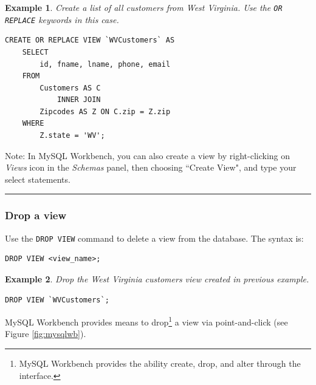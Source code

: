 \documentclass{article}
\newtheorem{example}{Example}
\begin{document}
  
 \begin{example}
 Create a list of all customers from West Virginia.  Use the \texttt{OR REPLACE} keywords in this case.
 \end{example}


\begin{lstlisting}[frame=single]  
CREATE OR REPLACE VIEW `WVCustomers` AS
	SELECT 
		id, fname, lname, phone, email
	FROM
		Customers AS C
			INNER JOIN
		Zipcodes AS Z ON C.zip = Z.zip
	WHERE
		Z.state = 'WV';
\end{lstlisting} 


\noindent Note: In MySQL Workbench, you can also create a view by right-clicking on \textit{Views} icon in the \textit{Schemas} panel, then choosing ``Create View", and type your select statements.   











\hspace{-0.5cm}\rule[-0.101in]{\textwidth}{0.0025in}
    
  


\subsubsection*{Drop a view}

Use the \texttt{DROP VIEW} command to delete a view from the database.  The syntax is:


\begin{lstlisting}[frame=single]  
DROP VIEW <view_name>;
\end{lstlisting} 


  
 \begin{example}
 Drop the West Virginia customers view created in previous example.
 \end{example}


\begin{lstlisting}[frame=single]  
DROP VIEW `WVCustomers`;
\end{lstlisting} 

\noindent MySQL Workbench provides means to drop\footnote{MySQL Workbench provides the ability create, drop, and alter through the interface.} a view via point-and-click (see Figure \ref{fig:mysqlwb}).  
\end{document}
